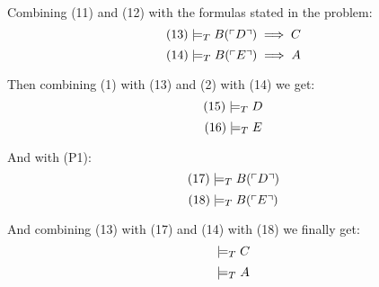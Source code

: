 \begin{enumerate}
    Combining (11) and (12) with the formulas stated in the problem:
    $$(13) \mathrel{|}\!=_T B(\ulcorner D \urcorner) \implies C$$
    $$(14) \mathrel{|}\!=_T B(\ulcorner E \urcorner) \implies A$$

    Then combining (1) with (13) and (2) with (14) we get:
    $$(15) \mathrel{|}\!=_T D$$
    $$(16) \mathrel{|}\!=_T E$$

    And with (P1):
    $$(17) \mathrel{|}\!=_T B(\ulcorner D \urcorner)$$
    $$(18) \mathrel{|}\!=_T B(\ulcorner E \urcorner)$$

    And combining (13) with (17) and (14) with (18) we finally get:
    $$\mathrel{|}\!=_T C$$
    $$\mathrel{|}\!=_T A$$

\end{enumerate}

